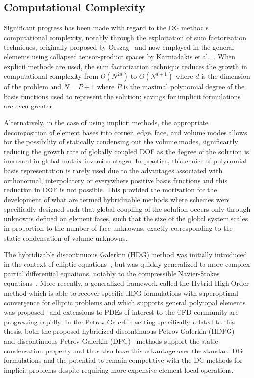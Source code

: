 \subsection{Computational Complexity}
\label{sec:background_comp_comp}

Significant progress has been made with regard to the DG method's computational
complexity, notably through the exploitation of sum factorization techniques,
originally proposed by Orszag~\cite{Orszag1980} and now employed in the
general elements using collapsed tensor-product spaces by Karniadakis et
al.~\cite{Karniadakis1999}. When explicit methods are used, the sum
factorization technique reduces the growth in computational complexity from
$O(N^{2d})$ to $O(N^{d+1})$ where $d$ is the dimension of the problem and $N =
P+1$ where $P$ is the maximal polynomial degree of the basis functions used to
represent the solution; savings for implicit formulations are even greater.

Alternatively, in the case of using implicit methods, the appropriate
decomposition of element bases into corner,
edge, face, and volume modes allows for the possibility of statically condensing out
the volume modes, significantly reducing the growth rate of globally coupled DOF
as the degree of the solution is increased in global matrix inversion stages.
In practice, this choice of polynomial basis representation is rarely used due
to the advantages associated with orthonormal, interpolatory or everywhere
positive basis functions and this reduction in DOF is not possible. This
provided the motivation for the development of what are termed
hybridizable methods where schemes were specifically designed such that global
coupling of the solution occurs only through unknowns defined on element faces,
such that the size of the global system scales in proportion to the number of
face unknowns, exactly corresponding to the static condensation of volume
unknowns.

The hybridizable discontinuous Galerkin (HDG) method was initially
introduced in the context of elliptic equations~\cite{Cockburn2009}, but was
quickly generalized to more complex partial differential equations, notably
to the compressible Navier-Stokes equations~\cite{Peraire2010}.
More recently, a generalized framework called the Hybrid High-Order method which
is able to recover specific HDG formulations with superoptimal convergence for
elliptic problems and which supports general polytopal elements was
proposed~\cite{DiPietro2015} and extensions to PDEs of interest to the CFD
community are progressing rapidly.
In the Petrov-Galerkin setting specifically related to this thesis, both the
proposed hybridized discontinuous
Petrov-Galerkin (HDPG)~\cite{Moro2012} and discontinuous Petrov-Galerkin
(DPG)~\cite{Demkowicz2010,Demkowicz2017} methods support the static condensation
property and thus also have this advantage over the standard DG formulations and
the potential to remain competitive with the DG methods for implicit problems
despite requiring more expensive element local operations.